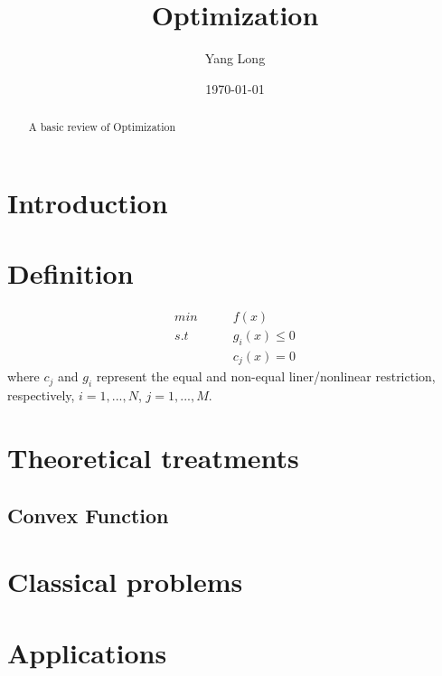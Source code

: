 \documentclass[%
 reprint,
 amsmath,amssymb,
 aps,
rmp,
]{revtex4-1}
\begin{document}

\title{Optimization}%

\author{Yang Long}

\date{\today}

\begin{abstract}
A basic review of Optimization
\end{abstract}

\maketitle

\section{Introduction}

\section{Definition}
\begin{eqnarray*}
min\qquad & f(x) \\
s.t\qquad & g_i(x)\leq 0 \\
\qquad & c_j(x) = 0
\end{eqnarray*}
where $c_j$ and $g_i$ represent the equal and non-equal liner/nonlinear restriction, respectively, $i = 1,...,N$, $j = 1,...,M$.

\section{Theoretical treatments}

\subsection{Convex Function}

\section{Classical problems}

\section{Applications}
\end{document}
